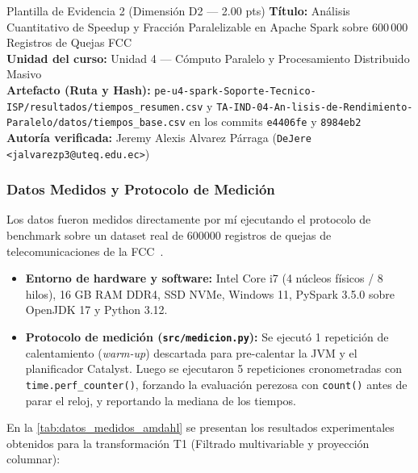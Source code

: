 \documentclass[11pt,a4paper]{article}
\begin{document}
\begin{evidenciabox}{Plantilla de Evidencia 2 (Dimensión D2 --- 2.00 pts)}
    \textbf{Título:} Análisis Cuantitativo de Speedup y Fracción Paralelizable en Apache Spark sobre 600\,000 Registros de Quejas FCC\\
    \textbf{Unidad del curso:} Unidad 4 --- Cómputo Paralelo y Procesamiento Distribuido Masivo\\
    \textbf{Artefacto (Ruta y Hash):} \texttt{pe-u4-spark-Soporte-Tecnico-ISP/\allowbreak{}resultados/\allowbreak{}tiempos\_resumen.csv} y \texttt{TA-IND-04-An-lisis-de-Rendimiento-Paralelo/\allowbreak{}datos/\allowbreak{}tiempos\_base.csv} en los commits \texttt{e4406fe} y \texttt{8984eb2}\\
    \textbf{Autoría verificada:} Jeremy Alexis Alvarez Párraga (\texttt{DeJere <jalvarezp3@uteq.edu.ec>})
\end{evidenciabox}

\subsubsection{Datos Medidos y Protocolo de Medición}
Los datos fueron medidos directamente por mí ejecutando el protocolo de benchmark sobre un dataset real de \num{600000} registros de quejas de telecomunicaciones de la FCC~\cite{fccdataset2026}.
\begin{itemize}
    \item \textbf{Entorno de hardware y software:} Intel Core i7 (4 núcleos físicos / 8 hilos), 16 GB RAM DDR4, SSD NVMe, Windows 11, PySpark 3.5.0 sobre OpenJDK 17 y Python 3.12.
    \item \textbf{Protocolo de medición (\texttt{src/medicion.py}):} Se ejecutó 1 repetición de calentamiento (\textit{warm-up}) descartada para pre-calentar la JVM y el planificador Catalyst. Luego se ejecutaron 5 repeticiones cronometradas con \texttt{time.perf\_counter()}, forzando la evaluación perezosa con \texttt{count()} antes de parar el reloj, y reportando la mediana de los tiempos.
\end{itemize}

En la \cref{tab:datos_medidos_amdahl} se presentan los resultados experimentales obtenidos para la transformación T1 (Filtrado multivariable y proyección columnar):
\end{document}
